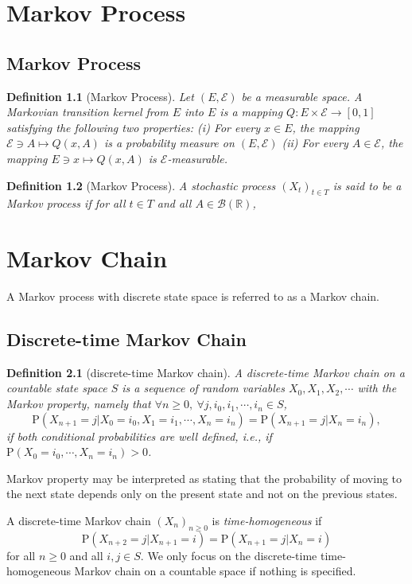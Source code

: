 \documentclass{report}
\newtheorem{definition}{Definition}[section]
\theoremstyle{nonumberplain}
\begin{document}
\chapter{Markov Process}
\section{Markov Process}
\begin{definition}[Markov Process]
Let $(E, \mathscr{E})$ be a measurable space. A Markovian transition kernel from $E$ into $E$ is a mapping $Q: E \times \mathscr{E} \longrightarrow[0,1]$ satisfying the following two properties:
(i) For every $x \in E$, the mapping $\mathscr{E} \ni A \mapsto Q(x, A)$ is a probability measure on $(E, \mathscr{E})$
(ii) For every $A \in \mathscr{E}$, the mapping $E \ni x \mapsto Q(x, A)$ is $\mathscr{E}$-measurable.
\end{definition}	


\begin{definition}[Markov Process]
A stochastic process $(X_t)_{t\in T}$ is said to be a \emph{Markov process} if for all $t\in T$ and all $A\in \mathcal{B}(\mathbb{R})$, 	

\end{definition}	

\chapter{Markov Chain}
A Markov process with discrete state space is referred to as a Markov chain.
\section{Discrete-time Markov Chain}
\begin{definition}[discrete-time Markov chain]
	A \emph{discrete-time Markov chain} on a countable state space $S$ is a sequence of random variables $X_0, X_1, X_2,\cdots$ with the Markov property, namely that $\forall n\ge0,\ \forall j,i_0,i_1,\cdots,i_n\in S$,	
	\[
	\mathrm{P}(X_{n+1}=j| X_{0}=i_{0},X_{1}=i_{1},\cdots,X_{n}=i_{n})=\mathrm{P}(X_{n+1}=j| X_{n}=i_{n}), 
	\] if both conditional probabilities are well defined, i.e., if $ 	\mathrm{P}(X_{0}=i_{0},\cdots ,X_{n}=i_{n})>0$.
\end{definition}	
Markov property may be interpreted as stating that the probability of moving to the next state depends only on the present state and not on the previous states. 

\noindent A discrete-time Markov chain $(X_n)_{n\ge0}$ is \emph{time-homogeneous} if
\[
\mathrm{P}(X_{n+2}=j| X_{n+1}=i)=\mathrm{P}(X_{n+1}=j| X_{n}=i)
\]
for all $n\ge0$ and all $i,j\in S$. We only focus on the discrete-time time-homogeneous Markov chain on a countable space if nothing is specified. 
\end{document}
